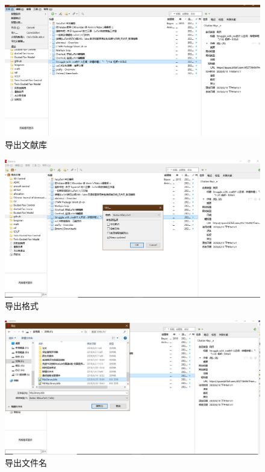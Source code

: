 \begin{figure}[htbp]
	\centering
	\includegraphics[scale=0.42]{Fig/zotero12.png}
	\caption{\label{output}导出文献库}
\end{figure}

\begin{figure}[htbp]
	\centering
	\includegraphics[scale=0.42]{Fig/zotero13.png}
	\caption{\label{output_format}导出格式}
\end{figure}

\begin{figure}[htbp]
	\centering
	\includegraphics[scale=0.42]{Fig/zotero14.png}
	\caption{\label{output_name}导出文件名}
\end{figure}









